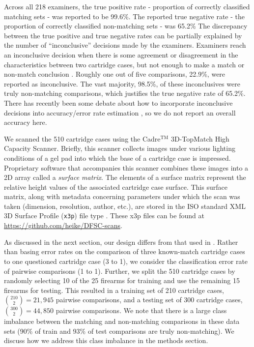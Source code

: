 \documentclass[11pt,]{isuthesis}
\begin{document}
Across all 218 examiners, the true positive rate - proportion of correctly classified matching sets - was reported to be 99.6\%.
The reported true negative rate - the proportion of correctly classified non-matching sets - was 65.2\%
The discrepancy between the true positive and true negative rates can be partially explained by the number of ``inconclusive'' decisions made by the examiners.
Examiners reach an inconclusive decision when there is some agreement or disagreement in the characteristics between two cartridge cases, but not enough to make a match or non-match conclusion \citep{AFTE1992}.
Roughly one out of five comparisons, 22.9\%, were reported as inconclusive.
The vast majority, 98.5\%, of these inconclusives were truly non-matching comparisons, which justifies the true negative rate of 65.2\%.
There has recently been some debate about how to incorporate inconclusive decisions into accuracy/error rate estimation \citep{hofmann_inconclusives_2021}, so we do not report an overall accuracy here.

We scanned the 510 cartridge cases using the Cadre\(^{\text{TM}}\) 3D-TopMatch High Capacity Scanner.
Briefly, this scanner collects images under various lighting conditions of a gel pad into which the base of a cartridge case is impressed.
Proprietary software that accompanies this scanner combines these images into a 2D array called a \emph{surface matrix}.
The elements of a surface matrix represent the relative height values of the associated cartridge case surface.
This surface matrix, along with metadata concerning parameters under which the scan was taken (dimension, resolution, author, etc.), are stored in the ISO standard XML 3D Surface Profile (\texttt{x3p}) file type \citep{ISO25178-72}.
These x3p files can be found at \url{https://github.com/heike/DFSC-scans}.

As discussed in the next section, our design differs from that used in \citet{Baldwin2014}.
Rather than basing error rates on the comparison of three known-match cartridge cases to one questioned cartridge case (3 to 1), we consider the classification error rate of pairwise comparisons (1 to 1).
Further, we split the 510 cartridge cases by randomly selecting 10 of the 25 firearms for training and use the remaining 15 firearms for testing.
This resulted in a training set of 210 cartridge cases, \(\binom{210}{2} = 21,945\) pairwise comparisons, and a testing set of 300 cartridge cases, \(\binom{300}{2} = 44,850\) pairwise comparisons.
We note that there is a large class imbalance between the matching and non-matching comparisons in these data sets (90\% of train and 93\% of test comparisons are truly non-matching).
We discuss how we address this class imbalance in the methods section.
\end{document}
